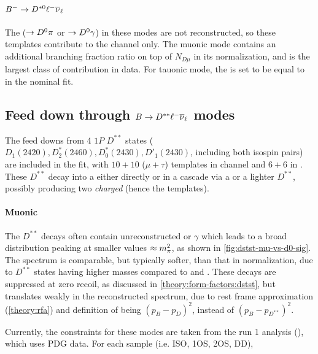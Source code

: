 \paragraph{${{{B}^-}} \rightarrow D^{*0}{\ell^-}{{\overline{\nu}}_\ell}$}
The \Dstarz ($\rightarrow {\ensuremath{{D}^0}} \pi$ or $\rightarrow {\ensuremath{{D}^0}} \gamma$)
in these modes are not reconstructed,
so these templates contribute to the \Dz channel only.
The muonic mode contains an additional branching fraction ratio on top of
$N_{D\mu}$ in its normalization, and is the largest class of contribution
in \Dz data.
For tauonic mode, the \RDstz is set to be equal to \RDstp in the nominal fit.


\subsection{Feed down through $B \rightarrow D^{**}{\ell^-}{{\overline{\nu}}_\ell}$ modes}
\label{tmpl:dstst}

The feed downs from 4 $1P$ $D^{**}$ states
($D_1(2420), D_2^*(2460), D_0^*(2430), D'_1(2430)$, including both isospin
pairs) are included in the fit,
with $10+10$ ($\mu+\tau$) templates in \Dz channel
and $6+6$ in \Dstar.
These $D^{**}$ decay into a \Dz either directly or in a
cascade via a \Dstar or a lighter $D^{**}$,
possibly producing two \emph{charged} \pion
(hence the \Dz\pion\pion templates).

\paragraph{Muonic}
The $D^{**}$ decays often contain unreconstructed \piz or $\gamma$ which leads
to a broad \mmSq distribution peaking at smaller values $\approx m^2_{\pi}$,
as shown in \cref{fig:dstst-mu-vs-d0-sig}.
The \el spectrum is comparable, but typically softer, than that in normalization,
due to $D^{**}$ states having higher masses compared to \Dz and \Dstar.
These decays are suppressed at zero recoil, as discussed in
\cref{theory:form-factors:dstst},
but translates weakly in the reconstructed \qSq spectrum, due to rest frame
approximation (\cref{theory:rfa}) and definition of \qSq being
$(p_B - p_D)^2$, instead of $(p_B - p_{D^{**}})^2$.

Currently, the constraints for these modes are
taken from the run 1 analysis (\cite{LHCb-ANA-2020-056}), which uses PDG data.
For each sample (i.e. ISO, 1OS, 2OS, DD),

